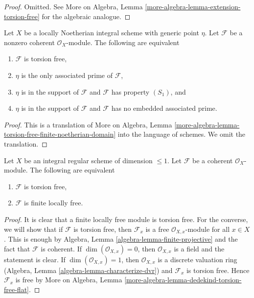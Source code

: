 \begin{proof}
Omitted. See
More on Algebra, Lemma \ref{more-algebra-lemma-extension-torsion-free}
for the algebraic analogue.
\end{proof}

\begin{lemma}
\label{lemma-torsion-free-finite-noetherian-domain}
Let $X$ be a locally Noetherian integral scheme with generic point $\eta$.
Let $\mathcal{F}$ be a nonzero coherent $\mathcal{O}_X$-module.
The following are equivalent
\begin{enumerate}
\item $\mathcal{F}$ is torsion free,
\item $\eta$ is the only associated prime of $\mathcal{F}$,
\item $\eta$ is in the support of $\mathcal{F}$ and $\mathcal{F}$
has property $(S_1)$, and
\item $\eta$ is in the support of $\mathcal{F}$ and $\mathcal{F}$
has no embedded associated prime.
\end{enumerate}
\end{lemma}

\begin{proof}
This is a translation of More on Algebra, Lemma
\ref{more-algebra-lemma-torsion-free-finite-noetherian-domain}
into the language of schemes. We omit the translation.
\end{proof}

\begin{lemma}
\label{lemma-torsion-free-over-regular-dim-1}
Let $X$ be an integral regular scheme of dimension $\leq 1$.
Let $\mathcal{F}$ be a coherent $\mathcal{O}_X$-module.
The following are equivalent
\begin{enumerate}
\item $\mathcal{F}$ is torsion free,
\item $\mathcal{F}$ is finite locally free.
\end{enumerate}
\end{lemma}

\begin{proof}
It is clear that a finite locally free module is torsion free.
For the converse, we will show that if $\mathcal{F}$ is
torsion free, then $\mathcal{F}_x$ is a free $\mathcal{O}_{X, x}$-module
for all $x \in X$. This is enough by
Algebra, Lemma \ref{algebra-lemma-finite-projective}
and the fact that $\mathcal{F}$ is coherent.
If $\dim(\mathcal{O}_{X, x}) = 0$, then
$\mathcal{O}_{X, x}$ is a field and the statement is clear.
If $\dim(\mathcal{O}_{X, x}) = 1$, then $\mathcal{O}_{X, x}$
is a discrete valuation ring
(Algebra, Lemma \ref{algebra-lemma-characterize-dvr})
and $\mathcal{F}_x$ is torsion free.
Hence $\mathcal{F}_x$ is free by More on Algebra, Lemma
\ref{more-algebra-lemma-dedekind-torsion-free-flat}.
\end{proof}

